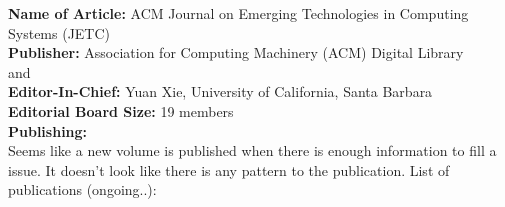 \documentclass[11pt]{article}
\newcommand\PUBLH{\vspace{.10in}\textbf{Publishing: \\ }}
\begin{document}
  
\newpage


\textbf{Name of Article:  } ACM Journal on Emerging Technologies in Computing Systems (JETC) \\
\textbf{Publisher:} Association for Computing Machinery (ACM) Digital Library \\
  and  \\
\textbf{Editor-In-Chief:}  Yuan Xie, University of California, Santa Barbara \\
\textbf{Editorial Board Size:} 19 members \\


\PUBLH
Seems like a new volume is published when there is enough information to fill a issue. It doesn't look 
like there is any pattern to the publication. List of publications (ongoing..): \\
\end{document}
